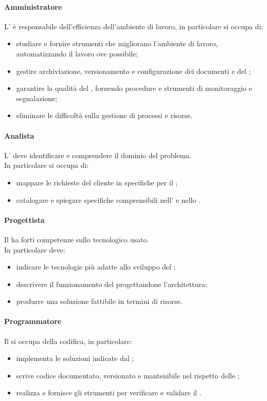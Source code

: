 \paragraph{Amministratore}
 L'\AMM{} è responsabile dell'efficienza dell'ambiente di lavoro, in particolare si occupa di:
 \begin{itemize}
  \item studiare e fornire strumenti che migliorano l'ambiente di lavoro, automatizzando il lavoro ove possibile;
  \item gestire archiviazione, versionamento e configurazione dei documenti e del ;
  \item garantire la qualità del , fornendo procedure e strumenti di monitoraggio e segnalazione;
  \item eliminare le difficoltà sulla gestione di processi e risorse.
 \end{itemize}
 \paragraph{Analista}
 L'\AN{} deve identificare e comprendere il dominio del problema. \\
 In particolare si occupa di:
 \begin{itemize}
  \item mappare le richieste del cliente in specifiche per il ;
  \item catalogare e spiegare specifiche comprensibili nell'\ARdoc{} e nello \SFdoc{}.
 \end{itemize}
 \paragraph{Progettista}
 Il \PJ{} ha forti competenze sullo  tecnologico usato. \\
 In particolare deve: 
 \begin{itemize}
  \item indicare le tecnologie più adatte allo sviluppo del ;
  \item descrivere il funzionamento del  progettandone l'architettura;
  \item produrre una soluzione fattibile in termini di risorse.
 \end{itemize}
 \paragraph{Programmatore}
 Il \PR{} si occupa della codifica, in particolare:
 \begin{itemize}
  \item implementa le soluzioni indicate dal \PJ ;
  \item scrive codice documentato, versionato e mantenibile nel rispetto delle \NPdoc ;
  \item realizza e fornisce gli strumenti per verificare e validare il .
 \end{itemize}
